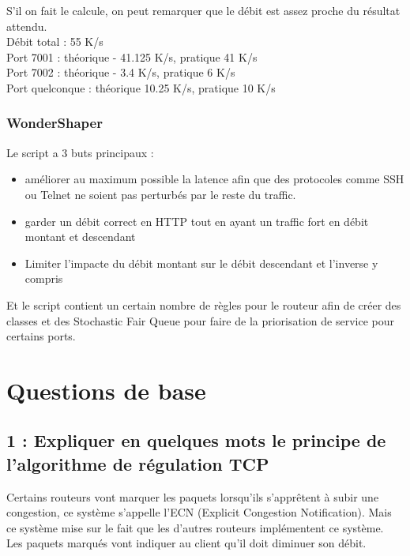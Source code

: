 \documentclass{article}
\begin{document}
S'il on fait le calcule, on peut remarquer que le débit est assez proche du résultat attendu. \\

Débit total : 55 K/s\\
Port 7001 : théorique - 41.125 K/s, pratique 41 K/s\\
Port 7002 : théorique - 3.4 K/s, pratique 6 K/s\\
Port quelconque : théorique 10.25 K/s, pratique 10 K/s

\subsubsection{WonderShaper}

Le script a 3 buts principaux : \\

\begin{itemize}
	\item améliorer au maximum possible la latence afin que des protocoles comme SSH ou Telnet ne soient pas perturbés par le reste du traffic.
	\item garder un débit correct en HTTP tout en ayant un traffic fort en débit montant et descendant
	\item Limiter l'impacte du débit montant sur le débit descendant et l'inverse y compris
\end{itemize}

Et le script contient un certain nombre de règles pour le routeur afin de créer des classes et des Stochastic Fair Queue pour faire de la priorisation de service pour certains ports.

\section{Questions de base}

\subsection*{1 : Expliquer en quelques mots le principe de l'algorithme de régulation TCP}

Certains routeurs vont marquer les paquets lorsqu'ils s'apprêtent à subir une congestion, ce système s'appelle l'ECN (Explicit Congestion Notification). Mais ce système mise sur le fait que les d'autres routeurs implémentent ce système. \cite{cours}\\

Les paquets marqués vont indiquer au client qu'il doit diminuer son débit.
\end{document}
